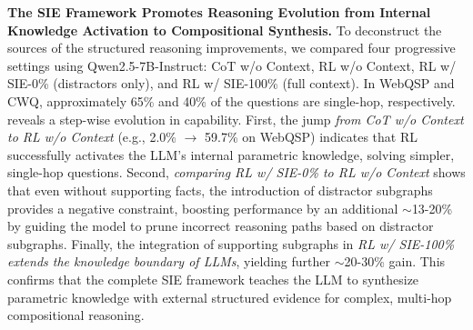 \documentclass{article} %
\begin{document}
\textbf{The SIE Framework Promotes Reasoning Evolution from Internal Knowledge Activation to Compositional Synthesis.}
To deconstruct the sources of the structured reasoning improvements, we compared four progressive settings using Qwen2.5-7B-Instruct: CoT w/o Context, RL w/o Context, RL w/ SIE-0\% (distractors only), and RL w/ SIE-100\% (full context).
In WebQSP and CWQ, approximately 65\% and 40\% of the questions are single-hop, respectively.
 reveals a step-wise evolution in capability.
First, the jump \textit{from CoT w/o Context to RL w/o Context} (e.g., 2.0\% $\rightarrow$ 59.7\% on WebQSP) indicates that RL successfully activates the LLM's internal parametric knowledge, solving simpler, single-hop questions.
Second, \textit{comparing RL w/ SIE-0\% to RL w/o Context} shows that even without supporting facts, the introduction of distractor subgraphs provides a negative constraint, boosting performance by an additional $\sim$13-20\% by guiding the model to prune incorrect reasoning paths based on distractor subgraphs.
Finally, the integration of supporting subgraphs in \textit{RL w/ SIE-100\% extends the knowledge boundary of LLMs}, yielding further $\sim$20-30\% gain.
This confirms that the complete SIE framework teaches the LLM to synthesize parametric knowledge with external structured evidence for complex, multi-hop compositional reasoning.


\begin{table}[!t]
\centering
\caption{Decomposition of performance gains across different environmental configurations. The step-wise improvements demonstrate how RL activates parametric knowledge, leverages negative constraints, and acieves compositional reasoning via internal and external knowledge synthesis.}
\vspace{-5pt}
\label{tab:decomposition}
\end{table}
\end{document}

